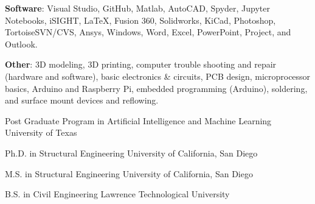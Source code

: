 \documentclass{leresume}
\begin{document}
\begin{bulletedlist}
		\item \textbf{Software}: Visual Studio,
                        GitHub,
                        Matlab,
                        AutoCAD,
                        Spyder,
                        Jupyter Notebooks,
                        iSIGHT,
                        LaTeX,
                        Fusion 360,
                        Solidworks,
                        KiCad,
                        Photoshop,
                        TortoiseSVN/CVS,
                        Ansys,
                        Windows,
                        Word,
                        Excel,
                        PowerPoint,
                        Project,
                        and Outlook.
                        
		\item \textbf{Other}: 3D modeling,
                        3D printing,
                        computer trouble shooting and repair (hardware and software),
                        basic electronics \& circuits,
                        PCB design,
                        microprocessor basics,
                        Arduino and Raspberry Pi,
                        embedded programming (Arduino),
                        soldering,
                        and surface mount devices and reflowing.
                        
	\end{bulletedlist}
	

	
                {Post Graduate Program in Artificial Intelligence and Machine Learning}
                {University of Texas}
		
                {Ph.D. in Structural Engineering}
                {University of California, San Diego}
		
                {M.S. in Structural Engineering}
                {University of California, San Diego}
		
                {B.S. in Civil Engineering}
                {Lawrence Technological University}
		

    
\end{document}
